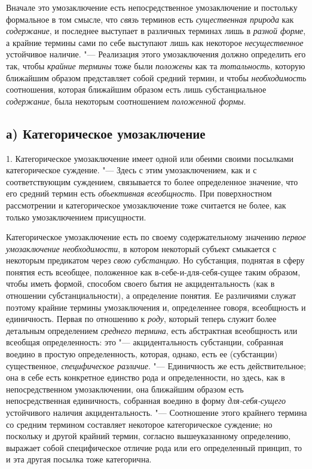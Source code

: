{{Вначале это умозаключение есть непосредственное умозаключение
и постольку формальное в том смысле, что
{\em связь} терминов есть
{\em существенная природа}
как {\em содержание},
и последнее выступает в различных терминах лишь в
{\em разной форме}, а
крайние термины сами по себе выступают лишь как некоторое
{\em несущественное}
устойчивое наличие. "--- Реализация этого
умозаключения должно определить его так, чтобы
{\em крайние термины
}тоже были
{\em положены} как та
{\em тотальность},
которую ближайшим образом представляет собой средний термин,
и чтобы {\em необходимость}
соотношения, которая ближайшим образом есть лишь
субстанциальное {\em содержание},
была некоторым соотношением
{\em положенной формы}.

\subsection[а) Категорическое умозаключение]{а) Категорическое умозаключение}
1. Категорическое умозаключение имеет одной или обеими своими
посылками категорическое
суждение.
"--- Здесь с этим умозаключением, как и с соответствующим
суждением, связывается то более определенное значение, что
его средний термин есть {\em объективная
всеобщность}. При поверхностном рассмотрении и
категорическое умозаключение тоже считается не более, как только
умозаключением присущности.

Категорическое умозаключение есть по своему содержательному
значению {\em первое умозаключение
необходимости}, в котором некоторый субъект смыкается с
некоторым предикатом через {\em свою
субстанцию}. Но субстанция, поднятая в сферу понятия есть
всеобщее, положенное как в-себе-и-для-себя-сущее таким образом, чтобы иметь
формой, способом своего бытия не акцидентальность (как в отношении
субстанциальности), а определение понятия. Ее различиями служат поэтому
крайние термины умозаключения и, определеннее говоря, всеобщность и
единичность. Первая по отношению к
{\em роду}, который
теперь служит более детальным определением
{\em среднего термина},
есть абстрактная всеобщность или всеобщая определенность:
это "--- акцидентальность субстанции, собранная воедино в
простую определенность, которая, однако, есть ее (субстанции) существенное,
{\em специфическое различие}. "---
Единичность же есть действительное; она в себе есть
конкретное единство рода и определенности, но здесь, как в непосредственном
умозаключении, она ближайшим образом есть непосредственная единичность,
собранная воедино в форму
{\em для-себя-сущего}
устойчивого наличия акцидентальность. "---
Соотношение этого крайнего термина со средним термином
составляет некоторое категорическое суждение; но поскольку и другой крайний
термин, согласно вышеуказанному определению, выражает собой специфическое
отличие рода или его определенный принцип, то и эта другая посылка тоже
категорична.

}}
